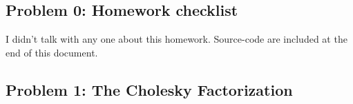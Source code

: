 \documentclass{article}
\begin{document}
 



\hypertarget{problem_0_homework_checklist_2}{}
\subsection*{{Problem 0: Homework checklist}}
\label{problem_0_homework_checklist_2}

\checkmark	I didn't talk with any one about this homework. \newline
\checkmark 	Source-code are included at the end of this document. 


\hypertarget{problem_0_homework_checklist_2}{}
\subsection*{{Problem 1: The Cholesky Factorization}}
\label{}
\end{document}
